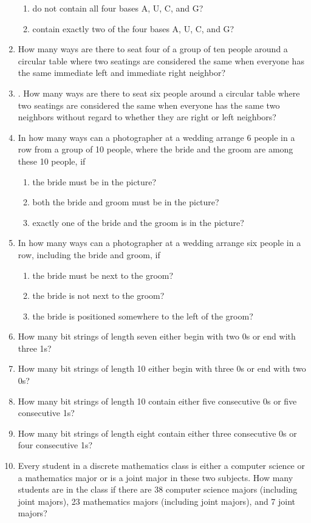 \documentclass[11pt,a4paper]{book}
\newcommand{\onestaritem}{\refstepcounter{enumi}\item[$*$\theenumi.]}
\newcommand{\twostaritem}{\refstepcounter{enumi}\item[$**$\theenumi.]}
\begin{document}
\begin{enumerate}
\begin{enumerate}
\item do not contain all four bases A, U, C, and G?
\item contain exactly two of the four bases A, U, C, and G?
\end{enumerate}
\item How many ways are there to seat four of a group of ten people around a circular table where two seatings are considered the same when everyone has the same immediate left and immediate right neighbor?
\item. How many ways are there to seat six people around a circular table where two seatings are considered the same when everyone has the same two neighbors without regard to whether they are right or left neighbors?
\item In how many ways can a photographer at a wedding arrange 6 people in a row from a group of 10 people, where the bride and the groom are among these 10 people, if
\begin{enumerate}[label=(\alph*)]
\item the bride must be in the picture?
\item both the bride and groom must be in the picture?
\item exactly one of the bride and the groom is in the picture?
\end{enumerate}
\item In how many ways can a photographer at a wedding arrange six people in a row, including the bride and groom, if
\begin{enumerate}[label=(\alph*)]
\item the bride must be next to the groom?
\item the bride is not next to the groom?
\item the bride is positioned somewhere to the left of the
groom?
\end{enumerate}
\item How many bit strings of length seven either begin with two 0s or end with three 1s?
\item How many bit strings of length 10 either begin with three 0s or end with two 0s?
\onestaritem How many bit strings of length 10 contain either five consecutive 0s or five consecutive 1s?
\twostaritem How many bit strings of length eight contain either three consecutive 0s or four consecutive 1s?
\item Every student in a discrete mathematics class is either a computer science or a mathematics major or is a joint major in these two subjects. How many students are in the class if there are 38 computer science majors (including joint majors), 23 mathematics majors (including joint majors), and 7 joint majors?

\end{enumerate}
\end{document}
